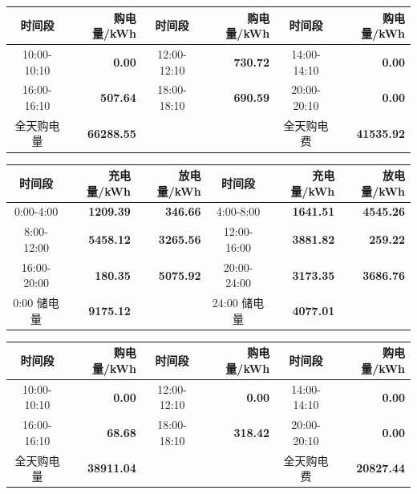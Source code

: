 {\setlength{\tabcolsep}{2pt}
\begin{center}
\begin{tabular}{|c|r|c|r|c|r|}
\hline
时间段 & 购电量/kWh & 时间段 & 购电量/kWh & 时间段 & 购电量/kWh \\
\hline
10:00-10:10 & \textbf{0.00} & 12:00-12:10 & \textbf{730.72} & 14:00-14:10 & \textbf{0.00} \\
\hline
16:00-16:10 & \textbf{507.64} & 18:00-18:10 & \textbf{690.59} & 20:00-20:10 & \textbf{0.00} \\
\hline
全天购电量 & \textbf{66288.55} & & & 全天购电费 & \textbf{41535.92} \\
\hline
\end{tabular}
\par{}

\vspace{0.15\baselineskip}
\begin{tabular}{|c|r|r|c|r|r|}
\hline
时间段 & 充电量/kWh & 放电量/kWh & 时间段 & 充电量/kWh & 放电量/kWh \\
\hline
0:00-4:00 & \textbf{1209.39} & \textbf{346.66} & 4:00-8:00 & \textbf{1641.51} & \textbf{4545.26} \\
\hline
8:00-12:00 & \textbf{5458.12} & \textbf{3265.56} & 12:00-16:00 & \textbf{3881.82} & \textbf{259.22} \\
\hline
16:00-20:00 & \textbf{180.35} & \textbf{5075.92} & 20:00-24:00 & \textbf{3173.35} & \textbf{3686.76} \\
\hline
0:00 储电量 & \textbf{9175.12} & & 24:00 储电量 & \textbf{4077.01} & \\
\hline
\end{tabular}
\par{}

\vspace{0.15\baselineskip}
\begin{tabular}{|c|r|c|r|c|r|}
\hline
时间段 & 购电量/kWh & 时间段 & 购电量/kWh & 时间段 & 购电量/kWh \\
\hline
10:00-10:10 & \textbf{0.00} & 12:00-12:10 & \textbf{0.00} & 14:00-14:10 & \textbf{0.00} \\
\hline
16:00-16:10 & \textbf{68.68} & 18:00-18:10 & \textbf{318.42} & 20:00-20:10 & \textbf{0.00} \\
\hline
全天购电量 & \textbf{38911.04} & & & 全天购电费 & \textbf{20827.44} \\
\hline
\end{tabular}
\par{}


\end{center}}
